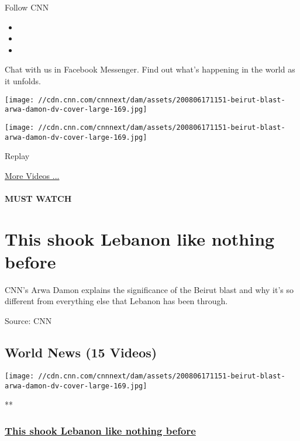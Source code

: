 Follow CNN

\begin{itemize}
\item
\item
\item
\end{itemize}

Chat with us in Facebook Messenger. Find out what's happening in the
world as it unfolds.

\texttt{[image: //cdn.cnn.com/cnnnext/dam/assets/200806171151-beirut-blast-arwa-damon-dv-cover-large-169.jpg]}

\texttt{[image: //cdn.cnn.com/cnnnext/dam/assets/200806171151-beirut-blast-arwa-damon-dv-cover-large-169.jpg]}\href{javascript:void(0);}{}

Replay

\href{/videos}{More Videos ...}

\hypertarget{must-watch}{%
\paragraph{MUST WATCH}\label{must-watch}}

\hypertarget{this-shook-lebanon-like-nothing-before}{%
\section{This shook Lebanon like nothing
before}\label{this-shook-lebanon-like-nothing-before}}

CNN's Arwa Damon explains the significance of the Beirut blast and why
it's so different from everything else that Lebanon has been through.

Source: CNN

\hypertarget{world-news-15-videos}{%
\subsection{World News (15 Videos)}\label{world-news-15-videos}}

\href{/videos/world/2020/08/06/beirut-explosion-arwa-damon-lon-orig.cnn/video/playlists/around-the-world/}{}

\texttt{[image: //cdn.cnn.com/cnnnext/dam/assets/200806171151-beirut-blast-arwa-damon-dv-cover-large-169.jpg]}

**

\hypertarget{this-shook-lebanon-like-nothing-before-1}{%
\subsubsection{\texorpdfstring{\href{/videos/world/2020/08/06/beirut-explosion-arwa-damon-lon-orig.cnn/video/playlists/around-the-world/}{This
shook Lebanon like nothing
before}}{This shook Lebanon like nothing before}}\label{this-shook-lebanon-like-nothing-before-1}}

